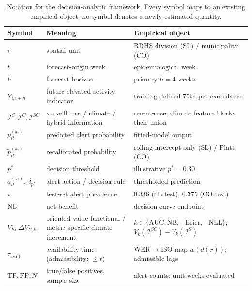 \documentclass[11pt,a4paper]{article}
\begin{document}
\begin{table}[htbp]
\centering
\caption{Notation for the decision-analytic framework. Every symbol maps to an existing empirical object; no symbol denotes a newly estimated quantity.}
\label{tab:notation}
\footnotesize{}
\begin{tabularx}{\textwidth}{@{}llY@{}}
\toprule
Symbol & Meaning & Empirical object \\
\midrule
$i$ & spatial unit & RDHS division (SL) / municipality (CO) \\
$t$ & forecast-origin week & epidemiological week \\
$h$ & forecast horizon & primary $h=4$ weeks \\
$Y_{i,t+h}$ & future elevated-activity indicator & training-defined 75th-pct exceedance \\
$\mathcal I^{S},\mathcal I^{C},\mathcal I^{SC}$ & surveillance / climate / hybrid information & recent-case, climate feature blocks; their union \\
$p^{(m)}_{it}$ & predicted alert probability & fitted-model output \\
$\widetilde p^{(m)}_{it}$ & recalibrated probability & rolling intercept-only (SL) / Platt (CO) \\
$p^*$ & decision threshold & illustrative $p^*=0.30$ \\
$a^{(m)}_{it},\ \delta_{p^*}$ & alert action / decision rule & thresholded prediction \\
$\pi$ & test-set alert prevalence & 0.336 (SL test), 0.375 (CO test) \\
$\mathrm{NB}$ & net benefit & decision-curve endpoint \\
$V_k,\ \Delta V_{C,k}$ & oriented value functional / metric-specific climate increment & $k\in\{\mathrm{AUC},\mathrm{NB},-\mathrm{Brier},-\mathrm{NLL}\}$; $V_k(\mathcal I^{SC})-V_k(\mathcal I^{S})$ \\
$\tau_{\mathrm{avail}}$ & availability time (admissibility: $\le t$) & WER$\to$ISO map $w(d(r))$; admissible lags \\
$\mathrm{TP},\mathrm{FP},N$ & true/false positives, sample size & alert counts; unit-weeks evaluated \\
\bottomrule
\end{tabularx}
\end{table}
\end{document}
